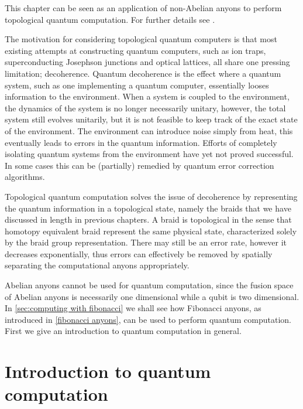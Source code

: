 \documentclass[a4paper,10pt,oneside]{book}
\theoremstyle{plain}
\theoremstyle{definition}
\theoremstyle{remark}
\begin{document}
This chapter can be seen as an application of non-Abelian anyons to perform topological quantum computation. For further details see \cite{nayak,freedman kitaev larsen wang,shor fault-tolerant,braid topologies}.

The motivation for considering topological quantum computers is that most existing attempts at constructing quantum computers, such as ion traps, superconducting Josephson junctions and optical lattices, all share one pressing limitation; decoherence. Quantum decoherence is the effect where a quantum system, such as one implementing a quantum computer, essentially looses information to the environment. When a system is coupled to the environment, the dynamics of the system is no longer necessarily unitary, however, the total system still evolves unitarily, but it is not feasible to keep track of the exact state of the environment. The environment can introduce noise simply from heat, this eventually leads to errors in the quantum information. Efforts of completely isolating quantum systems from the environment have yet not proved successful. In some cases this can be (partially) remedied by quantum error correction algorithms.

Topological quantum computation solves the issue of decoherence by representing the quantum information in a topological state, namely the braids that we have discussed in length in previous chapters. A braid is topological in the sense that homotopy equivalent braid represent the same physical state, characterized solely by the braid group representation. There may still be an error rate, however it decreases exponentially, thus errors can effectively be removed by spatially separating the computational anyons appropriately. \cite{freedman kitaev larsen wang}

Abelian anyons cannot be used for quantum computation, since the fusion space of Abelian anyons is necessarily one dimensional while a qubit is two dimensional. In \cref{sec:computing with fibonacci} we shall see how Fibonacci anyons, as introduced in \cref{fibonacci anyons}, can be used to perform quantum computation. First we give an introduction to quantum computation in general.


\section{Introduction to quantum computation}

\end{document}
